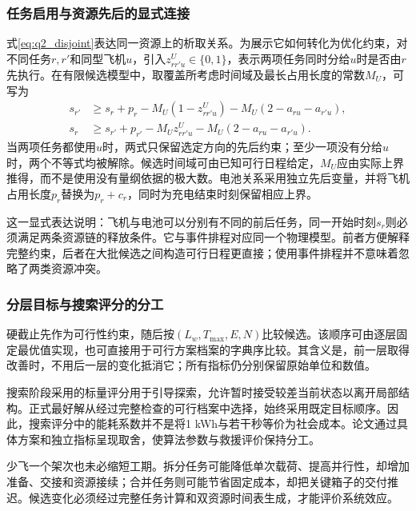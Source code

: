 \subsubsection{任务启用与资源先后的显式连接}
式\eqref{eq:q2_disjoint}表达同一资源上的析取关系。为展示它如何转化为优化约束，对不同任务$r,r'$和同型飞机$u$，引入$z^U_{rr'u}\in\{0,1\}$，表示两项任务同时分给$u$时是否由$r$先执行。在有限候选模型中，取覆盖所考虑时间域及最长占用长度的常数$M_U$，可写为
\begin{equation}
\begin{aligned}
s_{r'}&\ge s_r+p_r-M_U(1-z^U_{rr'u})-M_U(2-a_{ru}-a_{r'u}),\\
s_r&\ge s_{r'}+p_{r'}-M_Uz^U_{rr'u}-M_U(2-a_{ru}-a_{r'u}).
\end{aligned}
\label{eq:q2_plane_disjunction}
\end{equation}
当两项任务都使用$u$时，两式只保留选定方向的先后约束；至少一项没有分给$u$时，两个不等式均被解除。候选时间域可由已知可行日程给定，$M_U$应由实际上界推得，而不是使用没有量纲依据的极大数。电池关系采用独立先后变量，并将飞机占用长度$p_r$替换为$p_r+c_r$，同时为充电结束时刻保留相应上界。

这一显式表达说明：飞机与电池可以分别有不同的前后任务，同一开始时刻$s_r$则必须满足两条资源链的释放条件。它与事件排程对应同一个物理模型。前者方便解释完整约束，后者在大批候选之间构造可行日程更直接；使用事件排程并不意味着忽略了两类资源冲突。

\subsubsection{分层目标与搜索评分的分工}
硬截止先作为可行性约束，随后按$(L_w,T_{\max},E,N)$比较候选。该顺序可由逐层固定最优值实现，也可直接用于可行方案档案的字典序比较。其含义是，前一层取得改善时，不用后一层的变化抵消它；所有指标仍分别保留原始单位和数值。

搜索阶段采用的标量评分用于引导探索，允许暂时接受较差当前状态以离开局部结构。正式最好解从经过完整检查的可行档案中选择，始终采用既定目标顺序。因此，搜索评分中的能耗系数并不是将1 kWh与若干秒等价为社会成本。论文通过具体方案和独立指标呈现取舍，使算法参数与救援评价保持分工。

少飞一个架次也未必缩短工期。拆分任务可能降低单次载荷、提高并行性，却增加准备、交接和资源接续；合并任务则可能节省固定成本，却把关键箱子的交付推迟。候选变化必须经过完整任务计算和双资源时间表生成，才能评价系统效应。
